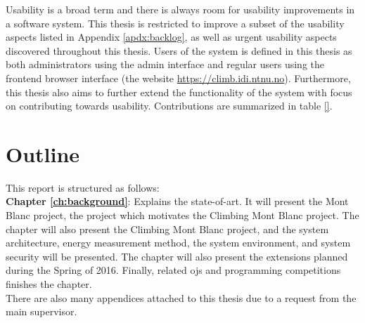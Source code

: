 Usability is a broad term and there is always room for usability improvements in a software system. This thesis is restricted to improve a subset of the usability aspects listed in Appendix \ref{apdx:backlog}, as well as urgent usability aspects discovered throughout this thesis. Users of the system is defined in this thesis as both administrators using the admin interface and regular users using the frontend browser interface (the website \url{https://climb.idi.ntnu.no}). Furthermore, this thesis also aims to further extend the functionality of the system with focus on contributing towards usability. Contributions are summarized in table \ref{}.



\section{Outline}
\label{sec:out}
This report is structured as follows:\\

\noindent
\textbf{Chapter \ref{ch:background}}: Explains the state-of-art. It will present the Mont Blanc project, the project which motivates the Climbing Mont Blanc project. The chapter will also present the Climbing Mont Blanc project, and the system architecture, energy measurement method, the system environment, and system security will be presented. The chapter will also present the extensions planned during the Spring of 2016. Finally, related \glspl{oj} and programming competitions finishes the chapter. \\

There are also many appendices attached to this thesis due to a request from the main supervisor.

